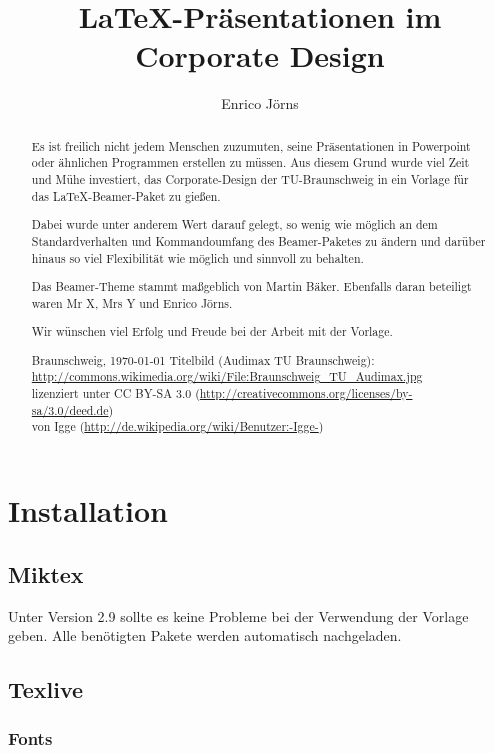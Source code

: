 \documentclass[cmyk,a4paper,colorscheme=green,TUBStitlepage=picture]{tubsreprt}
\author{Enrico Jörns}
\title{LaTeX-Präsentationen im Corporate Design}
\institute{TU-Braunschweig}
\begin{document}
\maketitle

\begin{abstract}
Es ist freilich nicht jedem Menschen zuzumuten, seine Präsentationen in
Powerpoint oder ähnlichen Programmen erstellen zu müssen.
Aus diesem Grund wurde viel Zeit und Mühe investiert, das Corporate-Design der
TU-Braunschweig in ein Vorlage für das \LaTeX-Beamer-Paket zu gießen.\medskip

Dabei wurde unter anderem Wert darauf gelegt, so wenig wie möglich an dem
Standardverhalten und Kommandoumfang des Beamer-Paketes zu ändern und darüber
hinaus so viel Flexibilität wie möglich und sinnvoll zu behalten.\medskip

Das Beamer-Theme stammt maßgeblich von Martin Bäker. Ebenfalls daran beteiligt
waren Mr X, Mrs Y und Enrico Jörns.%
\bigskip

Wir wünschen viel Erfolg und Freude bei der Arbeit mit der Vorlage.
\bigskip

{\hfill Braunschweig, \today}
\vfill
\footnotesize{Titelbild (Audimax TU Braunschweig): \url{http://commons.wikimedia.org/wiki/File:Braunschweig_TU_Audimax.jpg}\\
lizenziert unter CC BY-SA 3.0 (\url{http://creativecommons.org/licenses/by-sa/3.0/deed.de})\\
von Igge (\url{http://de.wikipedia.org/wiki/Benutzer:-Igge-})}
\end{abstract}

\clearpage
\tableofcontents

\chapter{Installation}

\section{Miktex}

Unter Version 2.9 sollte es keine Probleme bei der Verwendung der Vorlage geben.
Alle benötigten Pakete werden automatisch nachgeladen.

\section{Texlive}

\subsection{Fonts}
\end{document}

